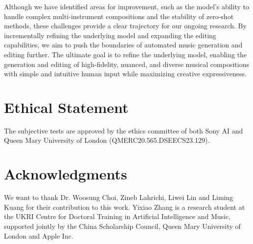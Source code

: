 Although we have identified areas for improvement, such as the model's ability to handle complex multi-instrument compositions and the stability of zero-shot methods, these challenges provide a clear trajectory for our ongoing research. By incrementally refining the underlying model and expanding the editing capabilities, we aim to push the boundaries of automated music generation and editing further. The ultimate goal is to refine the underlying model, enabling the generation and editing of high-fidelity, nuanced, and diverse musical compositions with simple and intuitive human input while maximizing creative expressiveness.

\section*{Ethical Statement}

The subjective tests are approved by the ethics committee of both Sony AI and Queen Mary University of London (QMERC20.565.DSEECS23.129).

\section*{Acknowledgments}

We want to thank Dr. Woosung Choi, Zineb Lahrichi, Liwei Lin and Liming Kuang for their contribution to this work. Yixiao Zhang is a research student at the UKRI Centre for Doctoral Training in Artificial Intelligence and Music, supported jointly by the China Scholarship Council, Queen Mary University of London and Apple Inc.

{\small }
